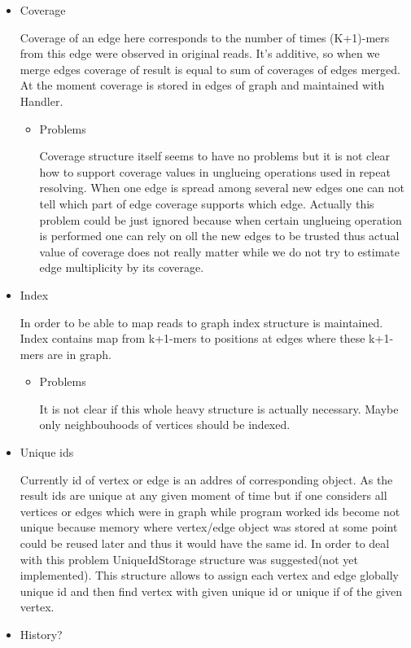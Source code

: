 \documentclass[14pt]{article}
\begin{document}
\begin{itemize}
\item Coverage

Coverage of an edge here corresponds to the number of times (K+1)-mers from this edge were observed in original reads. It's additive, so when we merge edges coverage of result is equal to sum of coverages of edges merged. At the moment coverage is stored in edges of graph and maintained with Handler.

\begin{itemize}
\item Problems

Coverage structure itself seems to have no problems but it is not clear how to support coverage values in unglueing operations used in repeat resolving. When one edge is spread among several new edges one can not tell which part of edge coverage supports which edge. Actually this problem could be just ignored because when certain unglueing operation is performed one can rely on oll the new edges to be trusted thus actual value of coverage does not really matter while we do not try to estimate edge multiplicity by its coverage.
\end{itemize}

\item Index

In order to be able to map reads to graph index structure is maintained. Index contains map from k+1-mers to positions at edges where these k+1-mers are in graph.

\begin{itemize}
\item Problems

It is not clear if this whole heavy structure is actually necessary. Maybe only neighbouhoods of vertices should be indexed.
\end{itemize}

\item Unique ids

Currently id of vertex or edge is an addres of corresponding object. As the result ids are unique at any given moment of time but if one considers all vertices or edges which were in graph while program worked ids become not unique because memory where vertex/edge object was stored at some point could be reused later and thus it would have the same id. In order to deal with this problem UniqueIdStorage structure was suggested(not yet implemented). This structure allows to assign each vertex and edge globally unique id and then find vertex with given unique id or unique if of the given vertex.

\item History?

\end{itemize}
\end{document}
